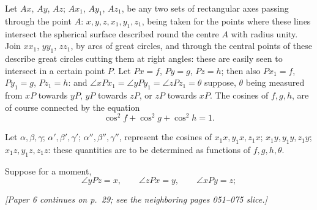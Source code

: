 \documentclass[11pt]{article}
\begin{document}
Let $Ax$, $Ay$, $Az$; $Ax_1$, $Ay_1$, $Az_1$, be any two sets of rectangular axes
passing through the point $A$: $x,y,z,x_1,y_1,z_1$, being taken for the points where
these lines intersect the spherical surface described round the centre $A$ with radius
unity. Join $xx_1$, $yy_1$, $zz_1$, by arcs of great circles, and through the central
points of these describe great circles cutting them at right angles: these are easily
seen to intersect in a certain point $P$. Let $Px=f$, $Py=g$, $Pz=h$; then also
$Px_1=f$, $Py_1=g$, $Pz_1=h$: and
$\angle xPx_1=\angle yPy_1=\angle zPz_1=\theta$ suppose, $\theta$ being measured
from $xP$ towards $yP$, $yP$ towards $zP$, or $zP$ towards $xP$. The cosines of
$f,g,h$, are of course connected by the equation
\[
\cos^{2}f+\cos^{2}g+\cos^{2}h=1.
\]

Let $\alpha,\beta,\gamma$; $\alpha',\beta',\gamma'$; $\alpha'',\beta'',\gamma''$,
represent the cosines of $x_1x,y_1x,z_1x$; $x_1y,y_1y,z_1y$; $x_1z,y_1z,z_1z$:
these quantities are to be determined as functions of $f,g,h,\theta$.

Suppose for a moment,
\[
\angle yPz=x,\qquad \angle zPx=y,\qquad \angle xPy=z;
\]

\medskip
\noindent\textit{[Paper 6 continues on p.~29; see the neighboring pages 051--075 slice.]}
\end{document}
